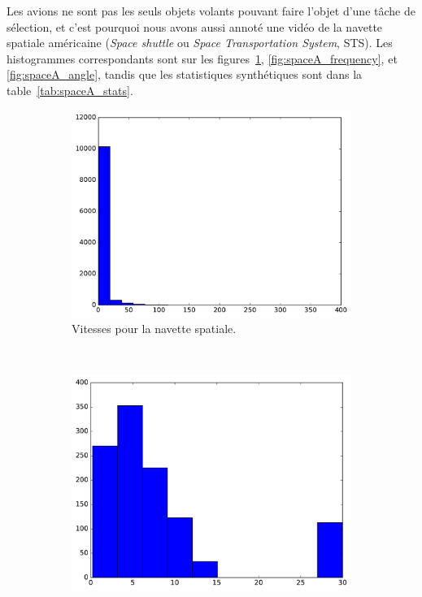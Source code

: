 	Les avions ne sont pas les seuls objets volants pouvant faire l'objet d'une tâche de sélection, et c'est pourquoi nous avons aussi annoté une vidéo de la navette spatiale américaine (\emph{Space shuttle} ou \emph{Space Transportation System}, STS). Les histogrammes correspondants sont sur les figures~\ref{fig:spaceA_speed}, \ref{fig:spaceA_frequency}, et \ref{fig:spaceA_angle}, tandis que les statistiques synthétiques sont dans la table~\ref{tab:spaceA_stats}.
	
	\begin{figure}
		\begin{subfigure}[t]{\subImgWaStats}
			\centering
			\includegraphics[width=\textwidth]{figures/ch3/spaceA_speed}
			\caption{Vitesses pour la navette spatiale.}
			\label{fig:spaceA_speed}
		\end{subfigure}
		~
		\begin{subfigure}[t]{\subImgWaStats}
			\centering
			\includegraphics[width=\textwidth]{figures/ch3/spaceA_frequency}

\end{subfigure}
\end{figure}
